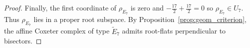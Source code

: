 \documentclass[10pt,a4paper]{amsart}
\begin{document}
\begin{proof}
		Finally, the first coordinate of \(\rho_{E_7}\) is zero and $-\frac{17}{2}+\frac{17}{2}=0$ so $\rho_{E_7}\in U_7$. Thus \(\rho_{E_7}\) lies in a proper root subspace. By
		Proposition~\ref{prop:geom_criterion}, the affine Coxeter complex of type
		\(\widetilde E_7\) admits root-flats perpendicular to bisectors.
		
	\end{proof}
\end{document}

